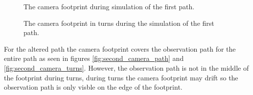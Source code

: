 \begin{figure}[!ht]
    \centering
    \caption{The camera footprint during simulation of the first path.}
	\label{fig:first_camera_path}
\end{figure}

\begin{figure}[!ht]
    \centering
    \caption{The camera footprint in turns during the simulation of the first path.}
	\label{fig:first_camera_turns}
\end{figure}

For the altered path the camera footprint covers the observation path for the entire path as seen in figures \ref{fig:second_camera_path} and \ref{fig:second_camera_turns}. However, the observation path is not in the middle of the footprint during turns, during turns the camera footprint may drift so the observation path is only visble on the edge of the footprint.


